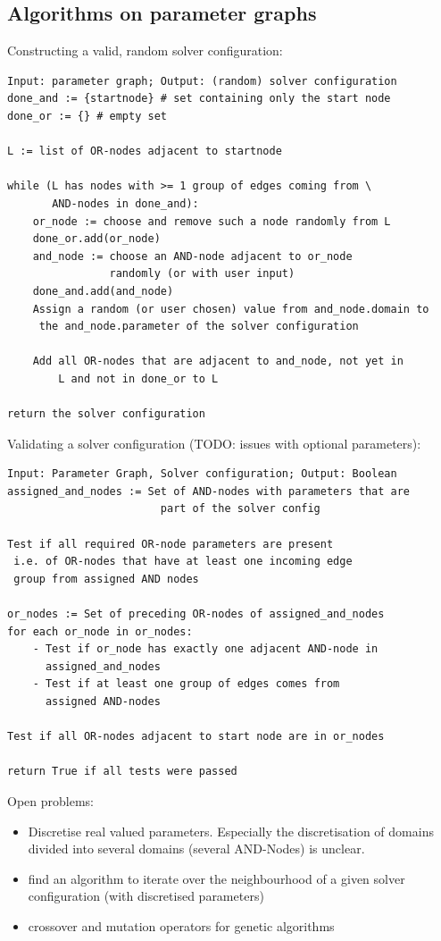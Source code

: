\subsection{Algorithms on parameter graphs}

Constructing a valid, random solver configuration:
\begin{verbatim}
Input: parameter graph; Output: (random) solver configuration
done_and := {startnode} # set containing only the start node
done_or := {} # empty set

L := list of OR-nodes adjacent to startnode

while (L has nodes with >= 1 group of edges coming from \
       AND-nodes in done_and):
    or_node := choose and remove such a node randomly from L
    done_or.add(or_node)
    and_node := choose an AND-node adjacent to or_node
                randomly (or with user input)
    done_and.add(and_node)
    Assign a random (or user chosen) value from and_node.domain to
     the and_node.parameter of the solver configuration 
    
    Add all OR-nodes that are adjacent to and_node, not yet in
        L and not in done_or to L

return the solver configuration
\end{verbatim}

Validating a solver configuration (TODO: issues with optional parameters):
\begin{verbatim}
Input: Parameter Graph, Solver configuration; Output: Boolean
assigned_and_nodes := Set of AND-nodes with parameters that are
                        part of the solver config

Test if all required OR-node parameters are present
 i.e. of OR-nodes that have at least one incoming edge
 group from assigned AND nodes
 
or_nodes := Set of preceding OR-nodes of assigned_and_nodes
for each or_node in or_nodes:
    - Test if or_node has exactly one adjacent AND-node in
      assigned_and_nodes
    - Test if at least one group of edges comes from
      assigned AND-nodes

Test if all OR-nodes adjacent to start node are in or_nodes

return True if all tests were passed
\end{verbatim}

Open problems:
\begin{itemize}
\item Discretise real valued parameters. Especially the discretisation of domains divided into several domains (several AND-Nodes) is unclear.
\item find an algorithm to iterate over the neighbourhood of a given solver configuration (with discretised parameters)
\item crossover and mutation operators for genetic algorithms
\end{itemize}

